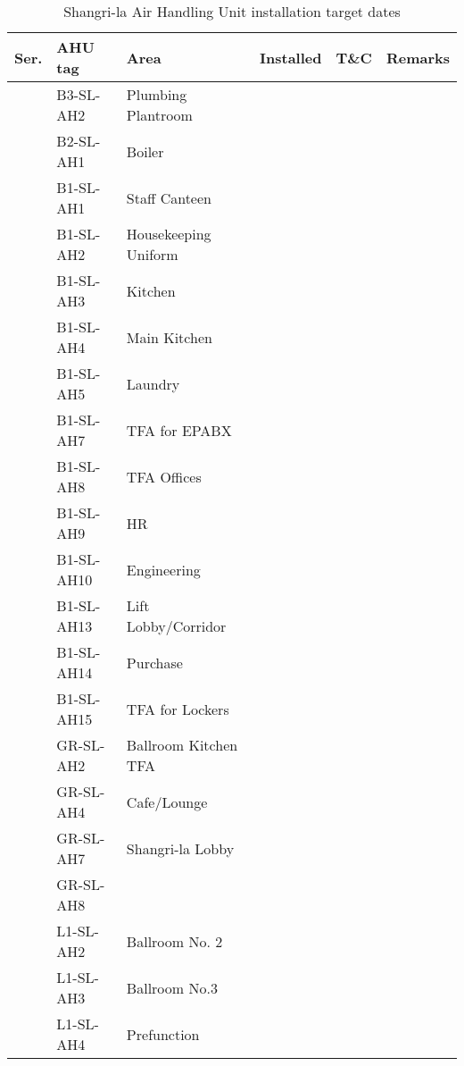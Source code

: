 \begin{table}[htbp]
\setcounter{step}{0}
\label{tbl:AHUSL}
\footnotesize
\caption{Shangri-la Air Handling Unit installation target dates}
\begin{tabular}{llp{3.2cm} c c l}
\toprule
 Ser.	 	 &AHU tag 	 &Area	 			&Installed	&T\&C &Remarks \\
\midrule

 
 \inc	 	 &B3-SL-AH2	 &Plumbing Plantroom	 	 &	 && \\
\midrule
 \inc	 	 &B2-SL-AH1     &Boiler	 	  	 & &&\\
 
\midrule

 \inc	 	 &B1-SL-AH1	 &Staff Canteen		  &   && \\
 \inc	 	 &B1-SL-AH2	 &Housekeeping Uniform	  &   && \\
 \inc	 	 &B1-SL-AH3	 &Kitchen		 	  &   && \\
 \inc	 	 &B1-SL-AH4	 &Main Kitchen	 		  &&  & \\
 \inc	 	 &B1-SL-AH5	 &Laundry	 	 	  &  & &\\

\inc	 	 &B1-SL-AH7    &TFA for EPABX		  &&  & \\
\inc	 	 &B1-SL-AH8	 &TFA Offices	            	  &&  & \\
\inc	 	 &B1-SL-AH9	 &HR	 	 		  &  & &\\
\inc	 	 &B1-SL-AH10	 &Engineering	 	 	  &&  & \\
 
\inc	 	 &B1-SL-AH13	 &Lift Lobby/Corridor	 	& &  & \\
\inc	 	 &B1-SL-AH14	 &Purchase	 	 	 & & &\\
\inc	 	 &B1-SL-AH15	 &TFA for Lockers	 	 & & & \\

\midrule

 
\inc	 	 &GR-SL-AH2	 &Ballroom Kitchen TFA	 &&&\\

\inc	 	 &GR-SL-AH4	 &Cafe/Lounge	 	& &&\\
 
\inc	 	 &GR-SL-AH7	 &Shangri-la Lobby	 	&& &\\
\inc	 	 &GR-SL-AH8	 &	 	 	 	& & &\\
\midrule


\inc	 	 &L1-SL-AH2	 &Ballroom No. 2	 	&  & &\\
\inc	 	 &L1-SL-AH3	 &Ballroom No.3	 	&  & &\\
\inc	 	 &L1-SL-AH4	 &Prefunction	 	 	& && \\
 

\end{tabular}
\end{table}
